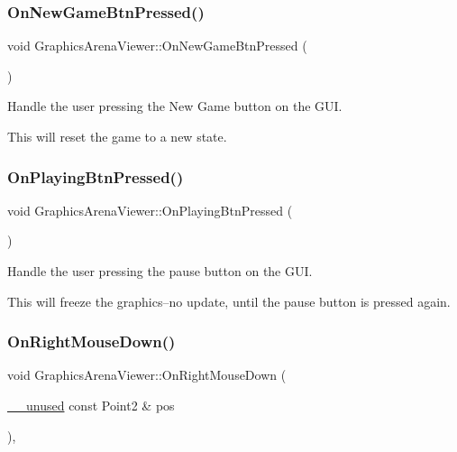 \subsubsection{\texorpdfstring{On\+New\+Game\+Btn\+Pressed()}{OnNewGameBtnPressed()}}
{\footnotesize\ttfamily void Graphics\+Arena\+Viewer\+::\+On\+New\+Game\+Btn\+Pressed (\begin{DoxyParamCaption}{ }\end{DoxyParamCaption})}



Handle the user pressing the New Game button on the G\+UI. 

This will reset the game to a new state. \mbox{\label{class_graphics_arena_viewer_a7cc65fd0e2e8c1f6138608e398c7c887}} 
\subsubsection{\texorpdfstring{On\+Playing\+Btn\+Pressed()}{OnPlayingBtnPressed()}}
{\footnotesize\ttfamily void Graphics\+Arena\+Viewer\+::\+On\+Playing\+Btn\+Pressed (\begin{DoxyParamCaption}{ }\end{DoxyParamCaption})}



Handle the user pressing the pause button on the G\+UI. 

This will freeze the graphics--no update, until the pause button is pressed again. \mbox{\label{class_graphics_arena_viewer_a178a9f09ff241d4dc032b6d0998cc9c6}} 
\subsubsection{\texorpdfstring{On\+Right\+Mouse\+Down()}{OnRightMouseDown()}}
{\footnotesize\ttfamily void Graphics\+Arena\+Viewer\+::\+On\+Right\+Mouse\+Down (\begin{DoxyParamCaption}\item[{\mbox{\hyperlink{common_8h_a2e3484535ee610c8e19e9859563abe48}{\+\_\+\+\_\+unused}} const Point2 \&}]{pos }\end{DoxyParamCaption})\hspace{0.3cm}{\ttfamily [inline]}, {\ttfamily [override]}}



